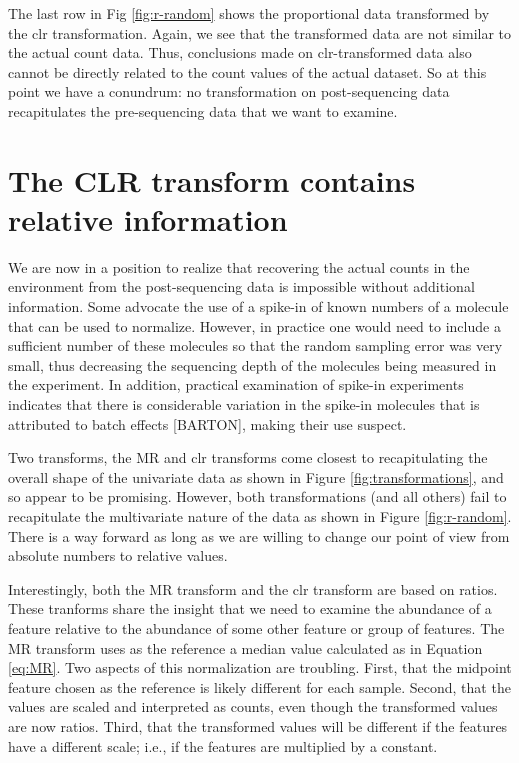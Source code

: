 \documentclass[onecolumn]{book}
\theoremstyle{definition}
\theoremstyle{definition}
\theoremstyle{definition}
\theoremstyle{remark}
\begin{document}
The last row in Fig \ref{fig:r-random} shows the proportional data
transformed by the clr transformation. Again, we see that the
transformed data are not similar to the actual count data. Thus,
conclusions made on clr-transformed data also cannot be directly related
to the count values of the actual dataset. So at this point we have a
conundrum: no transformation on post-sequencing data recapitulates the
pre-sequencing data that we want to examine.

\hypertarget{the-clr-transform-contains-relative-information}{%
\section{The CLR transform contains relative
information}\label{the-clr-transform-contains-relative-information}}

We are now in a position to realize that recovering the actual counts in
the environment from the post-sequencing data is impossible without
additional information. Some advocate the use of a spike-in of known
numbers of a molecule that can be used to normalize. However, in
practice one would need to include a sufficient number of these
molecules so that the random sampling error was very small, thus
decreasing the sequencing depth of the molecules being measured in the
experiment. In addition, practical examination of spike-in experiments
indicates that there is considerable variation in the spike-in molecules
that is attributed to batch effects {[}BARTON{]}, making their use
suspect.

Two transforms, the MR and clr transforms come closest to recapitulating
the overall shape of the univariate data as shown in Figure
\ref{fig:transformations}, and so appear to be promising. However, both
transformations (and all others) fail to recapitulate the multivariate
nature of the data as shown in Figure \ref{fig:r-random}. There is a way
forward as long as we are willing to change our point of view from
absolute numbers to relative values.

Interestingly, both the MR transform and the clr transform are based on
ratios. These tranforms share the insight that we need to examine the
abundance of a feature relative to the abundance of some other feature
or group of features. The MR transform uses as the reference a median
value calculated as in Equation \ref{eq:MR}. Two aspects of this
normalization are troubling. First, that the midpoint feature chosen as
the reference is likely different for each sample. Second, that the
values are scaled and interpreted as counts, even though the transformed
values are now ratios. Third, that the transformed values will be
different if the features have a different scale; i.e., if the features
are multiplied by a constant.
\end{document}
